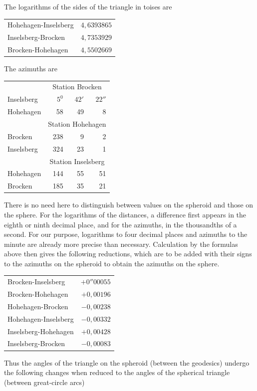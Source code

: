 \hspace*{\parindent}The logarithms of the sides of the triangle in toises are
\begin{center}
\begin{tabular}{lr}
Hohehagen-Inselsberg&\(4{,}6393865\)\\
Inselsberg-Brocken&\(4{,}7353929\)\\
Brocken-Hohehagen&\(4{,}5502669\)
\end{tabular}
\end{center}
\hspace*{\parindent}The azimuths are
\begin{center}
\begin{tabular}{lrrr}
&\multicolumn{3}{c}{Station Brocken}\\
Inselsberg&\(5^0\)&\(42'\)&\(22''\)\\
Hohehagen&58&49&8\\
&\multicolumn{3}{c}{Station Hohehagen}\\
Brocken&238&9&2\\
Inselsberg&324&23&1\\
&\multicolumn{3}{c}{Station Inselsberg}\\
Hohehagen&144&55&51\\
Brocken&185&35&21
\end{tabular}
\end{center}
\hspace*{\parindent}There is no need here to distinguish between values on the spheroid and those on the sphere. For the logarithms of the distances, a difference first appears in the eighth or ninth decimal place, and for the azimuths, in the thousandths of a second. For our purpose, logarithms to four decimal places and azimuths to the minute are already more precise than necessary. Calculation by the formulas above then gives the following reductions, which are to be added with their signs to the azimuths on the spheroid to obtain the azimuths on the sphere.
\begin{center}
\begin{tabular}{lr}
Brocken-Inselsberg&\(+0''00055\)\\
Brocken-Hohehagen&\(+0{,}00196\)\\
Hohehagen-Brocken&\(-0{,}00238\)\\
Hohehagen-Inselsberg&\(-0{,}00332\)\\
Inselsberg-Hohehagen&\(+0{,}00428\)\\
Inselsberg-Brocken&\(-0{,}00083\)
\end{tabular}
\end{center}
\hspace*{\parindent}Thus the angles of the triangle on the spheroid (between the geodesics) undergo the following changes when reduced to the angles of the spherical triangle (between great-circle arcs)
